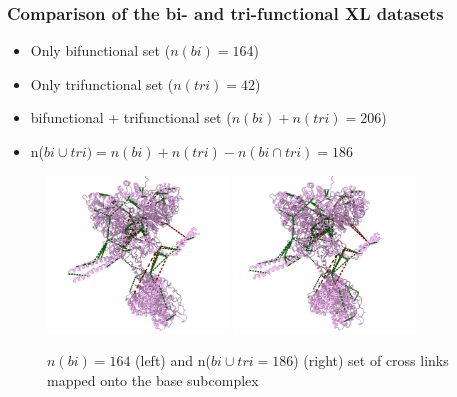 \documentclass[a4paper,8pt]{beamer}
\begin{document}
\begin{frame}
\frametitle{Comparison of the bi- and tri-functional XL datasets}
\begin{block}{}
\begin{itemize}
  \item Only bifunctional set ($n(bi) = 164$)
  \item Only trifunctional set ($n(tri)= 42$)
  \item bifunctional + trifunctional set ($n(bi) + n(tri) = 206$)
  \item n($bi \cup tri) = n(bi) + n(tri) - n(bi\cap tri) = 186$
\end{itemize}
\end{block}
    \begin{figure}
      \centering
      \includegraphics[width=0.43\textwidth]{figures/only-doubles.png}
      \includegraphics[width=0.43\textwidth]{figures/removed-doubles-plus-triples.png}
      \caption{$n(bi) = 164$ (left) and n($bi \cup tri = 186$) (right) set of cross links mapped onto the base subcomplex}
    \end{figure}
\end{frame}
\end{document}
